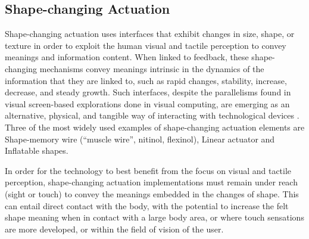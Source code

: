 
\subsection*{Shape-changing Actuation}

Shape-changing actuation uses interfaces that exhibit changes in size, shape, or texture in order to exploit the human visual and tactile perception to convey meanings and information content. When linked to feedback, these shape-changing mechanisms convey meanings intrinsic in the dynamics of the information that they are linked to, such as rapid changes, stability, increase, decrease, and steady growth. Such interfaces, despite the parallelisms found in visual screen-based explorations done in visual computing, are emerging as an alternative, physical, and tangible way of interacting with technological devices \cite{alexander_shape-changing_2017}.
Three of the most widely used examples of shape-changing actuation elements are Shape-memory wire (``muscle wire'', nitinol, flexinol), Linear actuator and Inflatable shapes.

In order for the technology to best benefit from the focus on visual and tactile perception, shape-changing actuation implementations must remain under reach (sight or touch) to convey the meanings embedded in the changes of shape. This can entail direct contact with the body, with the potential to increase the felt shape meaning when in contact with a large body area, or where touch sensations are more developed, or within the field of vision of the user.


